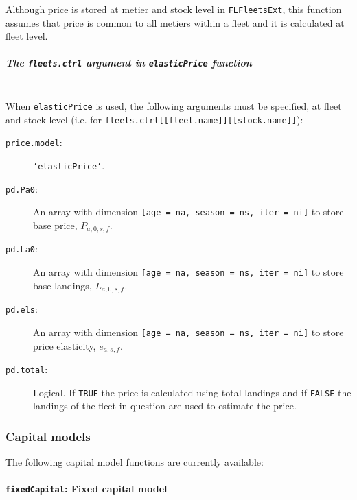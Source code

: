 Although price is stored at metier and stock level in \texttt{FLFleetsExt}, this function assumes that 
price is common to all metiers within a fleet and it is calculated at fleet level. 

\subparagraph{The \texttt{fleets.ctrl} argument in \texttt{elasticPrice} function}
\quad\\	

When \texttt{elasticPrice} is used, 
the following arguments must be specified, at fleet and stock level (i.e. for \texttt{fleets.ctrl[[fleet.name]][[stock.name]]}):

\begin{description}
	\item[\texttt{price.model}:] \texttt{'elasticPrice'}.
	\item[\texttt{pd.Pa0}:] An array with dimension \texttt{[age = na, season = ns, iter = ni]} to store base price,
							$P_{a,0,s,f}$.
	\item[\texttt{pd.La0}:] An array with dimension \texttt{[age = na, season = ns, iter = ni]} to store base landings, 
							$L_{a,0,s,f}$.
	\item[\texttt{pd.els}:] An array with dimension \texttt{[age = na, season = ns, iter = ni]} to store price elasticity,
							 $e_{a,s,f}$.
	\item[\texttt{pd.total}:] Logical. If \texttt{TRUE} the price is calculated using total landings and if 
							\texttt{FALSE} the landings of the fleet in question are used to estimate the price.
\end{description}



\subsubsection{Capital models}

  The following capital model functions are currently available:


\paragraph{\texttt{fixedCapital}: Fixed capital model} \hspace{0pt} \smallskip

